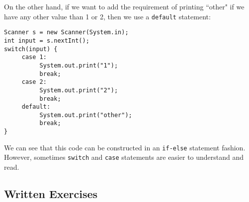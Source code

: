 \par On the other hand, if we want to add the requirement of printing ``other" if we have any other value than 1 or 2, then we use a \verb|default| statement:
\begin{lstlisting}
Scanner s = new Scanner(System.in);
int input = s.nextInt();
switch(input) {
     case 1:
          System.out.print("1");
          break;
     case 2:
          System.out.print("2");
          break;
     default:
          System.out.print("other");
          break;
}
\end{lstlisting}
We can see that this code can be constructed in an \verb|if-else| statement fashion. However, sometimes \verb|switch| and \verb|case| statements are easier to understand and read.

\subsection{Written Exercises}

